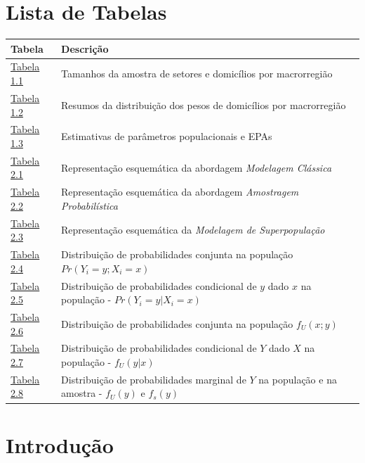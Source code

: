 \documentclass[
  12pt,
  brazilian,
]{book}
\theoremstyle{definition}
\theoremstyle{definition}
\theoremstyle{definition}
\theoremstyle{definition}
\theoremstyle{remark}
\begin{document}
\hypertarget{lista-de-tabelas}{%
\chapter*{Lista de Tabelas}\label{lista-de-tabelas}}

\begin{longtable}[]{@{}
  >{\raggedright\arraybackslash}p{}
  >{\raggedright\arraybackslash}p{}@{}}
\toprule
Tabela & Descrição \\
\midrule
\endhead
\href{introduc.html\#tab:tab:numset}{Tabela 1.1} & Tamanhos da amostra de setores e domicílios por macrorregião \\
\href{introduc.html\#tab:tab01b}{Tabela 1.2} & Resumos da distribuição dos pesos de domicílios por macrorregião \\
\href{introduc.html\#tab:tab01c}{Tabela 1.3} & Estimativas de parâmetros populacionais e EPAs \\
\href{refinf.html\#tab:modelclass}{Tabela 2.1} & Representação esquemática da abordagem \emph{Modelagem Clássica} \\
\href{refinf.html\#tab:modelamo}{Tabela 2.2} & Representação esquemática da abordagem \emph{Amostragem Probabilística} \\
\href{refinf.html\#tab:modelsuperpop}{Tabela 2.3} & Representação esquemática da \emph{Modelagem de Superpopulação} \\
\href{refinf.html\#tab:Tab24}{Tabela 2.4} & Distribuição de probabilidades conjunta na população \(Pr( Y_i = y ; X_i = x )\) \\
\href{refinf.html\#tab:Tab25}{Tabela 2.5} & Distribuição de probabilidades condicional de \(y\) dado \(x\) na população - \(Pr( Y_i = y | X_i = x )\) \\
\href{refinf.html\#tab:Tab26}{Tabela 2.6} & Distribuição de probabilidades conjunta na população \(f_U( x ; y )\) \\
\href{refinf.html\#tab:Tab27}{Tabela 2.7} & Distribuição de probabilidades condicional de \(Y\) dado \(X\) na população - \(f_U( y | x )\) \\
\href{refinf.html\#tab:Tab28}{Tabela 2.8} & Distribuição de probabilidades marginal de \(Y\) na população e na amostra - \(f_U(y)\) e \(f_s(y)\) \\
\bottomrule
\end{longtable}

\hypertarget{introduc}{%
\chapter{Introdução}\label{introduc}}
\end{document}
